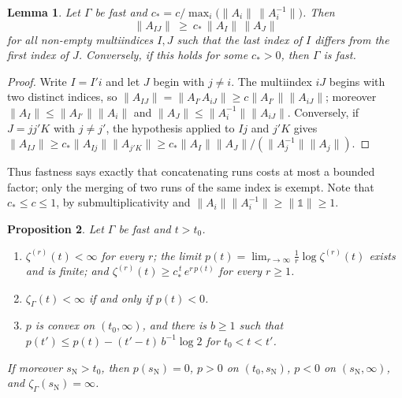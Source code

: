 \documentclass[11pt]{amsart}
\newcommand{\id}{\mathds{1}}
\newtheorem{proposition}{Proposition}[section]
\newtheorem{lemma}[proposition]{Lemma}
\theoremstyle{definition}
\theoremstyle{remark}
\newcommand{\sN}{s_{\mathrm N}}
\newcommand{\norm}[1]{\lVert #1\rVert}
\begin{document}
\begin{lemma}\label{lem:fastruns}
Let $\Gamma$ be fast and $c_*=c/\max_i\bigl(\norm{A_i}\,\norm{A_i^{-1}}\bigr)$.
Then
\[
  \norm{A_{IJ}}\ \ge\ c_*\,\norm{A_I}\,\norm{A_J}
\]
for all non-empty multiindices $I,J$ such that the last index of $I$ differs from the
first index of $J$. Conversely, if this holds for some $c_*>0$, then $\Gamma$ is
fast.
\end{lemma}

\begin{proof}
Write $I=I'i$ and let $J$ begin with $j\neq i$. The multiindex $iJ$ begins with two
distinct indices, so $\norm{A_{IJ}}=\norm{A_{I'}A_{iJ}}\ge c\norm{A_{I'}}\norm{A_{iJ}}$;
moreover $\norm{A_I}\le\norm{A_{I'}}\norm{A_i}$ and
$\norm{A_J}\le\norm{A_i^{-1}}\norm{A_{iJ}}$. Conversely, if $J=jj'K$ with $j\ne j'$,
the hypothesis applied to $Ij$ and $j'K$ gives
$\norm{A_{IJ}}\ge c_*\norm{A_{Ij}}\norm{A_{j'K}}
\ge c_*\norm{A_I}\norm{A_J}/(\norm{A_j^{-1}}\norm{A_j})$.
\end{proof}

Thus fastness says exactly that concatenating runs costs at most a bounded factor;
only the merging of two runs of the same index is exempt. Note that
$c_*\le c\le1$, by submultiplicativity and $\norm{A_i}\norm{A_i^{-1}}\ge\norm{\id}\ge1$.

\begin{proposition}\label{prop:runpressure}
Let $\Gamma$ be fast and $t>t_0$.
\begin{enumerate}
\item[(i)] $\zeta^{(r)}(t)<\infty$ for every $r$; the limit
  $p(t)=\lim_{r\to\infty}\frac1r\log\zeta^{(r)}(t)$ exists and is finite; and
  $\zeta^{(r)}(t)\ge c_*^{\,t}\,e^{r\,p(t)}$ for every $r\ge1$.
\item[(ii)] $\zeta_\Gamma(t)<\infty$ if and only if $p(t)<0$.
\item[(iii)] $p$ is convex on $(t_0,\infty)$, and there is $b\ge1$ such that
  $p(t')\le p(t)-(t'-t)\,b^{-1}\log2$ for $t_0<t<t'$.
\end{enumerate}
If moreover $\sN>t_0$, then $p(\sN)=0$, $p>0$ on $(t_0,\sN)$, $p<0$ on
$(\sN,\infty)$, and $\zeta_\Gamma(\sN)=\infty$.
\end{proposition}
\end{document}
